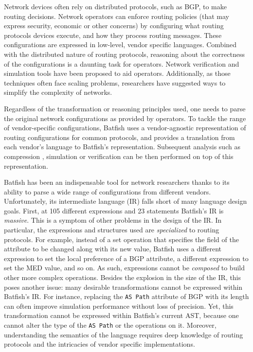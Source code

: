 \documentclass[sigconf,10pt]{acmart}
\begin{document}
Network devices often rely on distributed protocols, such as BGP, to
make routing decisions. Network operators can enforce routing policies
(that may express security, economic or other concerns) by configuring
what routing protocols devices execute, and how they process routing
messages.  These configurations are expressed in low-level, vendor
specific languages. Combined with the distributed nature of routing
protocols, reasoning about the correctness of the configurations is a
daunting task for operators.  Network verification
\cite{minesweeper,arc} and simulation tools \cite{batfish} have been
proposed to aid operators. Additionally, as those techniques often
face scaling problems, researchers have suggested ways \cite{bonsai} to simplify the complexity of networks.

Regardless of the transformation or reasoning principles used, one
needs to parse the original network configurations as provided by
operators. To tackle the range of vendor-specific configurations,
Batfish \cite{batfish} uses a vendor-agnostic representation of
routing configurations for common protocols, and provides a translation from each vendor's
language to Batfish's representation. Subsequent analysis such as
compression \cite{bonsai}, simulation \cite{batfish} or verification
\cite{minesweeper,arc} can be then performed on top of this
representation.

Batfish has been an indispensable tool for network researchers thanks
to its ability to parse a wide range of configurations from different
vendors. Unfortunately, its intermediate language (IR) falls short of
many language design goals. First, at 105 different expressions and 23
statements Batfish's IR is \emph{massive}. This is a symptom of other
problems in the design of the IR. In particular, the expressions and
structures used are \emph{specialized} to routing protocols. For
example, instead of a set operation that specifies the field of the
attribute to be changed along with its new value, Batfish uses a
different expression to set the local preference of a BGP attribute, a
different expression to set the MED value, and so on. As such,
expressions cannot be \emph{composed} to build other more complex
operations. Besides the explosion in the size of the IR, this poses
another issue: many desirable transformations cannot be expressed
within Batfish's IR. For instance, replacing the \texttt{AS Path}
attribute of BGP with its length can often improve simulation
performance without loss of precision. Yet, this transformation cannot
be expressed within Batfish's current AST, because one cannot alter
the type of the \texttt{AS Path} or the operations on it. Moreover,
understanding the semantics of the language requires deep knowledge of
routing protocols and the intricacies of vendor specific implementations.
\end{document}
